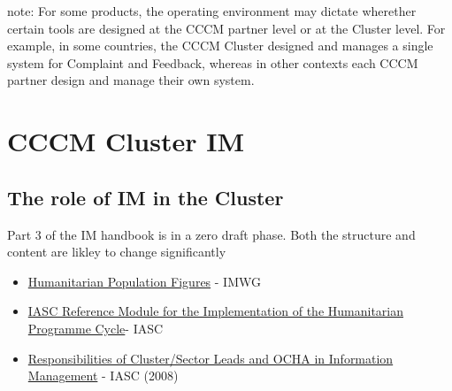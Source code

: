 \documentclass[
  a4paper,
  onecolumn,
  oneside]{book}
\providecommand{\tightlist}{%
  \setlength{\itemsep}{0pt}\setlength{\parskip}{0pt}}\usepackage{longtable,booktabs,array}
\begin{document}
note: For some products, the operating environment may dictate wherether
certain tools are designed at the CCCM partner level or at the Cluster
level. For example, in some countries, the CCCM Cluster designed and
manages a single system for Complaint and Feedback, whereas in other
contexts each CCCM partner design and manage their own system.

\part{CCCM Cluster IM}

\hypertarget{the-role-of-im-in-the-cluster}{%
\chapter{The role of IM in the
Cluster}\label{the-role-of-im-in-the-cluster}}

\begin{tcolorbox}[enhanced jigsaw, colframe=quarto-callout-warning-color-frame, title=\textcolor{quarto-callout-warning-color}{\faExclamationTriangle}\hspace{0.5em}{Warning}, toptitle=1mm, toprule=.15mm, colbacktitle=quarto-callout-warning-color!10!white, breakable, arc=.35mm, coltitle=black, bottomrule=.15mm, titlerule=0mm, opacityback=0, rightrule=.15mm, bottomtitle=1mm, leftrule=.75mm, left=2mm, opacitybacktitle=0.6, colback=white]

Part 3 of the IM handbook is in a zero draft phase. Both the structure
and content are likley to change significantly

\end{tcolorbox}

\begin{tcolorbox}[enhanced jigsaw, colframe=quarto-callout-tip-color-frame, title=\textcolor{quarto-callout-tip-color}{\faLightbulb}\hspace{0.5em}{Recommended reading}, toptitle=1mm, toprule=.15mm, colbacktitle=quarto-callout-tip-color!10!white, breakable, arc=.35mm, coltitle=black, bottomrule=.15mm, titlerule=0mm, opacityback=0, rightrule=.15mm, bottomtitle=1mm, leftrule=.75mm, left=2mm, opacitybacktitle=0.6, colback=white]

\begin{itemize}
\tightlist
\item
  \href{files/humanitarianprofilesupportguidance_final_may2016.pdf}{Humanitarian
  Population Figures} - IMWG
\item
  \href{files/humanitarianprofilesupportguidance_final_may2016.pdf}{IASC
  Reference Module for the Implementation of the Humanitarian Programme
  Cycle}- IASC
\item
  \href{files/Operational\%20Guidance\%20on\%20Responsibilities\%20of\%20Cluster-Sector\%20Leads\%20and\%20OCHA\%20in\%20Information\%20Management.pdf}{Responsibilities
  of Cluster/Sector Leads and OCHA in Information Management} - IASC
  (2008)
\end{itemize}

\end{tcolorbox}
\end{document}
